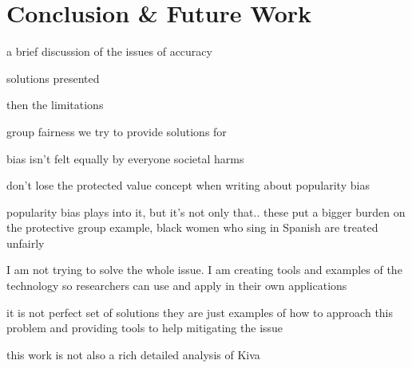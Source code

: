 \chapter{Conclusion \& Future Work}
\label{conclude}


a brief discussion of the issues of accuracy

solutions presented

then the limitations

group fairness we try to provide solutions for

bias isn't felt equally by everyone
societal harms

don't lose the protected value concept when writing about popularity bias

popularity bias plays into it, but it's not only that.. these put a bigger burden on the protective group
example, black women who sing in Spanish are treated unfairly

I am not trying to solve the whole issue. I am creating tools and examples of the technology so researchers can use and apply in their own applications

it is not perfect set of solutions they are just examples of how to approach this problem and providing tools to help mitigating the issue

this work is not also a rich detailed analysis of Kiva





